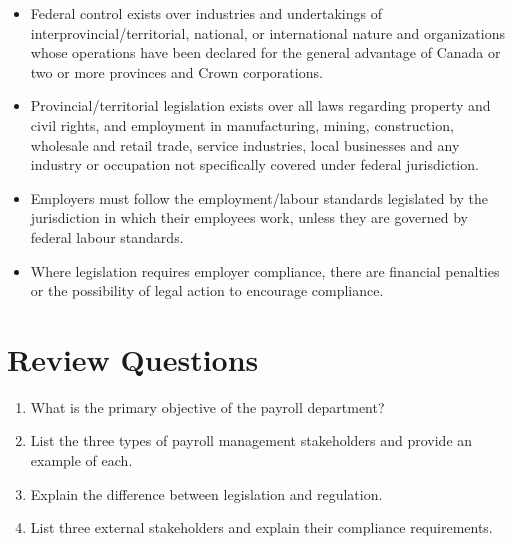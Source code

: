 \documentclass[letterpaper,10pt,english]{sphinxmanual}
\begin{document}
\begin{itemize}
\item {} 
\sphinxAtStartPar
Federal control exists over industries and undertakings of inter\sphinxhyphen{}provincial/territorial, national, or international nature and organizations whose operations have been declared for the general advantage of Canada or two or more provinces and Crown corporations.

\item {} 
\sphinxAtStartPar
Provincial/territorial legislation exists over all laws regarding property and civil rights, and employment in manufacturing, mining, construction, wholesale and retail trade, service industries, local businesses and any industry or occupation not specifically covered under federal jurisdiction.

\item {} 
\sphinxAtStartPar
Employers must follow the employment/labour standards legislated by the jurisdiction in which their employees work, unless they are governed by federal labour standards.

\item {} 
\sphinxAtStartPar
Where legislation requires employer compliance, there are financial penalties or the possibility of legal action to encourage compliance.

\end{itemize}


\chapter{Review Questions}
\label{\detokenize{1_introduction:review-questions}}\begin{enumerate}
%
\item {} 
\sphinxAtStartPar
What is the primary objective of the payroll department?

\item {} 
\sphinxAtStartPar
List the three types of payroll management stakeholders and provide an example of each.

\item {} 
\sphinxAtStartPar
Explain the difference between legislation and regulation.

\item {} 
\sphinxAtStartPar
List three external stakeholders and explain their compliance requirements.

\end{enumerate}

\sphinxstepscope
\end{document}
